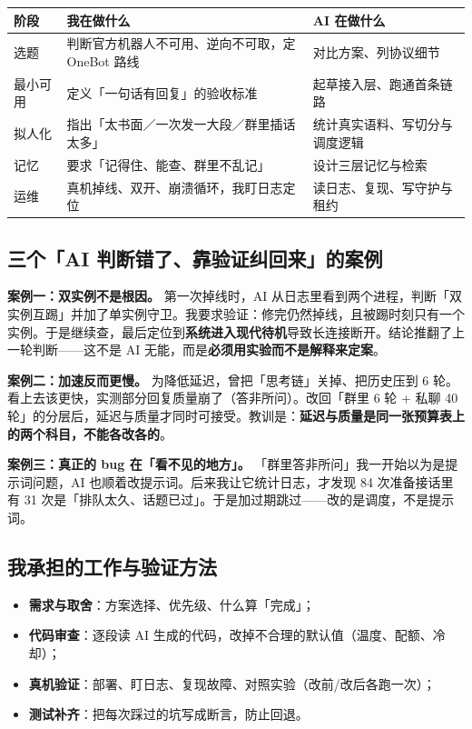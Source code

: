 \documentclass[11pt,a4paper]{ctexart}
\begin{document}
\begin{table}[H]
\centering\footnotesize
\begin{tabularx}{\textwidth}{@{}p{2.2cm}p{6.2cm}X@{}}
\toprule
阶段 & 我在做什么 & AI 在做什么 \\
\midrule
选题 & 判断官方机器人不可用、逆向不可取，定 OneBot 路线 & 对比方案、列协议细节 \\
最小可用 & 定义「一句话有回复」的验收标准 & 起草接入层、跑通首条链路 \\
拟人化 & 指出「太书面／一次发一大段／群里插话太多」 & 统计真实语料、写切分与调度逻辑 \\
记忆 & 要求「记得住、能查、群里不乱记」 & 设计三层记忆与检索 \\
运维 & 真机掉线、双开、崩溃循环，我盯日志定位 & 读日志、复现、写守护与租约 \\
\bottomrule
\end{tabularx}
\end{table}

\subsection{三个「AI 判断错了、靠验证纠回来」的案例}

\textbf{案例一：双实例不是根因。} 第一次掉线时，AI 从日志里看到两个进程，判断「双实例互踢」并加了单实例守卫。我要求验证：修完仍然掉线，且被踢时刻只有一个实例。于是继续查，最后定位到\textbf{系统进入现代待机}导致长连接断开。结论推翻了上一轮判断——这不是 AI 无能，而是\textbf{必须用实验而不是解释来定案}。

\textbf{案例二：加速反而更慢。} 为降低延迟，曾把「思考链」关掉、把历史压到 6 轮。看上去该更快，实测部分回复质量崩了（答非所问）。改回「群里 6 轮 + 私聊 40 轮」的分层后，延迟与质量才同时可接受。教训是：\textbf{延迟与质量是同一张预算表上的两个科目，不能各改各的}。

\textbf{案例三：真正的 bug 在「看不见的地方」。} 「群里答非所问」我一开始以为是提示词问题，AI 也顺着改提示词。后来我让它统计日志，才发现 84 次准备接话里有 31 次是「排队太久、话题已过」。于是加过期跳过——改的是调度，不是提示词。

\subsection{我承担的工作与验证方法}

\begin{itemize}[leftmargin=1.6em]
\item \textbf{需求与取舍}：方案选择、优先级、什么算「完成」；
\item \textbf{代码审查}：逐段读 AI 生成的代码，改掉不合理的默认值（温度、配额、冷却）；
\item \textbf{真机验证}：部署、盯日志、复现故障、对照实验（改前/改后各跑一次）；
\item \textbf{测试补齐}：把每次踩过的坑写成断言，防止回退。
\end{itemize}
\end{document}
